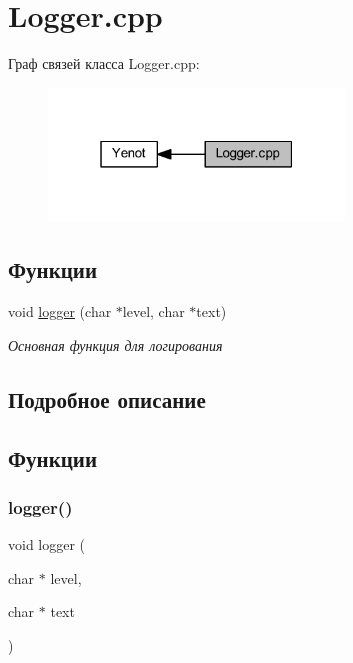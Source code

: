 \hypertarget{group__loggercpp}{}\section{Logger.\+cpp}
\label{group__loggercpp}
Граф связей класса Logger.\+cpp\+:
\nopagebreak
\begin{figure}[H]
\begin{center}
\leavevmode
\includegraphics[width=223pt]{group__loggercpp}
\end{center}
\end{figure}
\subsection*{Функции}
\begin{DoxyCompactItemize}
\item 
void \mbox{\hyperlink{group__loggercpp_ga0d6abeb129096910c85ae6cba8bb59cf}{logger}} (char $\ast$level, char $\ast$text)
\begin{DoxyCompactList}\small\item\em Основная функция для логирования \end{DoxyCompactList}\end{DoxyCompactItemize}


\subsection{Подробное описание}


\subsection{Функции}
\mbox{\label{group__loggercpp_ga0d6abeb129096910c85ae6cba8bb59cf}} 
\subsubsection{\texorpdfstring{logger()}{logger()}}
{\footnotesize\ttfamily void logger (\begin{DoxyParamCaption}\item[{char $\ast$}]{level,  }\item[{char $\ast$}]{text }\end{DoxyParamCaption})}




